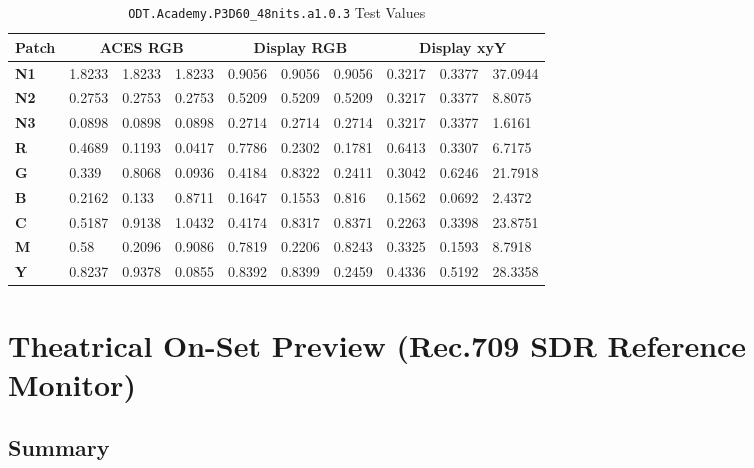 \begin{table}[ht!]
    \centering
    \begin{tabular}{|l|l|l|l|l|l|l|l|l|l|}
        \hline
        \multicolumn{1}{|c|}{\textbf{Patch}} & \multicolumn{3}{c|}{\textbf{ACES RGB}} & \multicolumn{3}{c|}{\textbf{Display RGB}} & \multicolumn{3}{c|}{\textbf{Display xyY}} \\ \hline
        \textbf{N1} & 1.8233 & 1.8233 & 1.8233 & 0.9056 & 0.9056 & 0.9056 & 0.3217 & 0.3377 & 37.0944 \\ \hline
        \textbf{N2} & 0.2753 & 0.2753 & 0.2753 & 0.5209 & 0.5209 & 0.5209 & 0.3217 & 0.3377 & 8.8075  \\ \hline
        \textbf{N3} & 0.0898 & 0.0898 & 0.0898 & 0.2714 & 0.2714 & 0.2714 & 0.3217 & 0.3377 & 1.6161  \\ \hline
        \textbf{R}  & 0.4689 & 0.1193 & 0.0417 & 0.7786 & 0.2302 & 0.1781 & 0.6413 & 0.3307 & 6.7175  \\ \hline
        \textbf{G}  & 0.339  & 0.8068 & 0.0936 & 0.4184 & 0.8322 & 0.2411 & 0.3042 & 0.6246 & 21.7918 \\ \hline
        \textbf{B}  & 0.2162 & 0.133  & 0.8711 & 0.1647 & 0.1553 & 0.816  & 0.1562 & 0.0692 & 2.4372  \\ \hline
        \textbf{C}  & 0.5187 & 0.9138 & 1.0432 & 0.4174 & 0.8317 & 0.8371 & 0.2263 & 0.3398 & 23.8751 \\ \hline
        \textbf{M}  & 0.58   & 0.2096 & 0.9086 & 0.7819 & 0.2206 & 0.8243 & 0.3325 & 0.1593 & 8.7918  \\ \hline
        \textbf{Y}  & 0.8237 & 0.9378 & 0.0855 & 0.8392 & 0.8399 & 0.2459 & 0.4336 & 0.5192 & 28.3358 \\ \hline
        \end{tabular}
        \caption{\texttt{ODT.Academy.P3D60\_48nits.a1.0.3} Test Values}
        \label{tab:testValues-p3d60}
\end{table}

\clearpage
\section{Theatrical On-Set Preview (Rec.709 SDR Reference Monitor)}
\label{sec:ot-app-rec709d60sim}

\subsection{Summary}
\label{subsec:summary-rec709d60sim}


